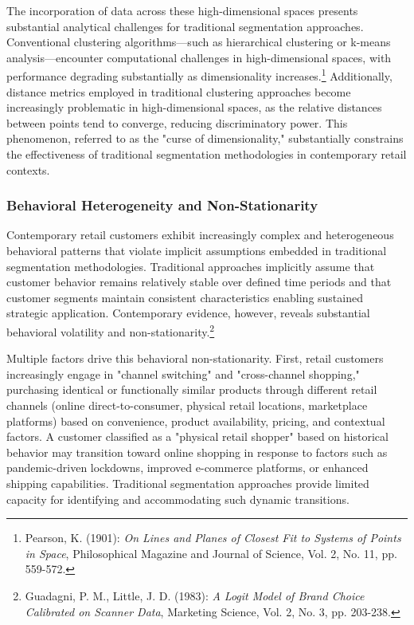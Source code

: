 \documentclass[12pt,a4paper,oneside]{report}
\begin{document}
The incorporation of data across these high-dimensional spaces presents substantial analytical challenges for traditional segmentation approaches. Conventional clustering algorithms—such as hierarchical clustering or k-means analysis—encounter computational challenges in high-dimensional spaces, with performance degrading substantially as dimensionality increases.\footnote{Pearson, K. (1901): \textit{On Lines and Planes of Closest Fit to Systems of Points in Space}, Philosophical Magazine and Journal of Science, Vol. 2, No. 11, pp. 559-572.} Additionally, distance metrics employed in traditional clustering approaches become increasingly problematic in high-dimensional spaces, as the relative distances between points tend to converge, reducing discriminatory power. This phenomenon, referred to as the "curse of dimensionality," substantially constrains the effectiveness of traditional segmentation methodologies in contemporary retail contexts.

\subsubsection{Behavioral Heterogeneity and Non-Stationarity}

Contemporary retail customers exhibit increasingly complex and heterogeneous behavioral patterns that violate implicit assumptions embedded in traditional segmentation methodologies. Traditional approaches implicitly assume that customer behavior remains relatively stable over defined time periods and that customer segments maintain consistent characteristics enabling sustained strategic application. Contemporary evidence, however, reveals substantial behavioral volatility and non-stationarity.\footnote{Guadagni, P. M., Little, J. D. (1983): \textit{A Logit Model of Brand Choice Calibrated on Scanner Data}, Marketing Science, Vol. 2, No. 3, pp. 203-238.}

Multiple factors drive this behavioral non-stationarity. First, retail customers increasingly engage in "channel switching" and "cross-channel shopping," purchasing identical or functionally similar products through different retail channels (online direct-to-consumer, physical retail locations, marketplace platforms) based on convenience, product availability, pricing, and contextual factors. A customer classified as a "physical retail shopper" based on historical behavior may transition toward online shopping in response to factors such as pandemic-driven lockdowns, improved e-commerce platforms, or enhanced shipping capabilities. Traditional segmentation approaches provide limited capacity for identifying and accommodating such dynamic transitions.
\end{document}
